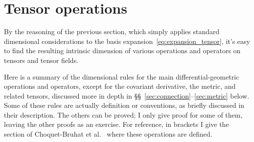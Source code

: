 \documentclass[\ifafour a4paper,12pt,\else a5paper,10pt,\fi%
onecolumn,oneside,article,%
british%
]{memoir}
\theoremstyle{remark}
\theoremstyle{innote}
\newcommand*{\citey}{\parencites*}%
\renewcommand*{\|}[1][]{\nonscript\,#1\vert\nonscript\;\mathopen{}}
\newcommand*{\sects}{\S\S}%
\newcommand*{\etal}{{et al.}}
\newcommand*{\Le}{\textsf{L}}
\newcommand*{\Ti}{\textsf{T}}
\newcommand*{\Cu}{\textsf{I}}
\begin{document}


\section{Tensor operations}
\label{sec:tensor_ops}

By the reasoning of the previous section, which simply applies standard
dimensional considerations to the basis
expansion~\eqref{eq:expansion_tensor}, it's easy to find the resulting
intrinsic dimension of various operations and operators on tensors and
tensor fields.

Here is a summary of the dimensional rules for the main
differential-geometric operations and operators, except for the covariant
derivative, the metric, and related tensors, discussed more in depth in
\sects~\ref{sec:connection}--\ref{sec:metric} below. Some of these rules
are actually definition or conventions, as briefly discussed in their
description. The others can be proved; I only give proof for some of them,
leaving the other proofs as an exercise. For reference, in brackets I give
the section of Choquet-Bruhat \etal\ \citey{choquetbruhatetal1977_r1996}
where these operations are defined.
\end{document}
